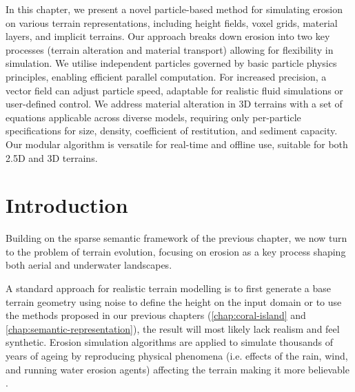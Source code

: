 
\abstract




In this chapter, we present a novel particle-based method for simulating erosion on various terrain representations, including height fields, voxel grids, material layers, and implicit terrains. Our approach breaks down erosion into two key processes (terrain alteration and material transport) allowing for flexibility in simulation. We utilise independent particles governed by basic particle physics principles, enabling efficient parallel computation. For increased precision, a vector field can adjust particle speed, adaptable for realistic fluid simulations or user-defined control. We address material alteration in 3D terrains with a set of equations applicable across diverse models, requiring only per-particle specifications for size, density, coefficient of restitution, and sediment capacity. Our modular algorithm is versatile for real-time and offline use, suitable for both 2.5D and 3D terrains.
\pagebreak

\minitoc

\section{Introduction}
Building on the sparse semantic framework of the previous chapter, we now turn to the problem of terrain evolution, focusing on erosion as a key process shaping both aerial and underwater landscapes. 

A standard approach for realistic terrain modelling is to first generate a base terrain geometry using noise to define the height on the input domain \cite{Musgrave1989, Olsen2004, Roudier1993} or to use the methods proposed in our previous chapters (\cref{chap:coral-island} and \cref{chap:semantic-representation}), the result will most likely lack realism and feel synthetic. Erosion simulation algorithms are applied to simulate thousands of years of ageing by reproducing physical phenomena (i.e. effects of the rain, wind, and running water erosion agents) affecting the terrain making it more believable \cite{Stachniak2005, Smelik2009, Galin2019}.

